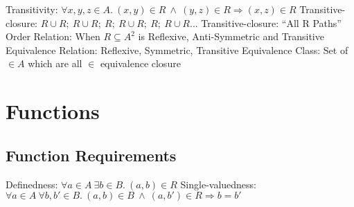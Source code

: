 \documentclass[12pt]{article}
\begin{document}
Transitivity: \begin{math}\forall x,y,z\in A.\ \left ( x,y \right )\in R\ \wedge\ \left ( y,z \right )\in R\Rightarrow \left ( x,z \right ) \in R\end{math}\newline\newline
Transitive-closure: \begin{math}R\cup R;\ R\cup R;\ R;\ R\cup R;\ R;\ R\cup R...\end{math}\newline\newline
Transitive-closure: ``All R Paths'' \newline\newline
Order Relation: When \begin{math}R\subseteq A^{2}\end{math} is Reflexive, Anti-Symmetric and Transitive\newline\newline
Equivalence Relation: Reflexive, Symmetric, Transitive\newline\newline
Equivalence Class: Set of \begin{math}\in A\end{math} which are all \begin{math}\in\end{math} equivalence closure\newpage
\section{Functions}
\subsection{Function Requirements}
Definedness: \begin{math}\forall a \in A\ \exists b \in B.\ \left ( a,b \right )\in R\end{math}\newline\newline
Single-valuedness: \begin{math}\forall a \in A\ \forall b,b' \in B.\  \left ( a,b \right )\in B\ \wedge\ \left ( a,b' \right )\in R\Rightarrow b=b'\end{math}\newline\newline
\end{document}

